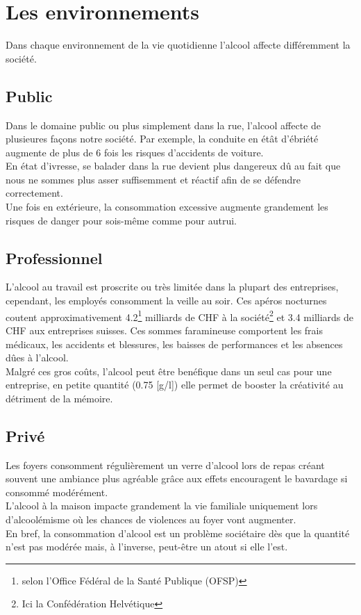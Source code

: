 \documentclass[a4paper, 12pt]{extarticle}
\begin{document}
  \section{Les environnements}
  Dans chaque environnement de la vie quotidienne l'alcool affecte différemment la société.
  \subsection{Public}
  Dans le domaine public ou plus simplement dans la rue, l'alcool affecte de plusieures façons notre société. Par exemple, la conduite en étât d'ébriété augmente de plus de 6 fois les risques d'accidents de voiture.\\
  En état d'ivresse, se balader dans la rue devient plus dangereux dû au fait que nous ne sommes plus asser suffisemment et réactif afin de se défendre correctement.\\
  Une fois en extérieure, la consommation excessive augmente grandement les risques de danger pour sois-même comme pour autrui.
  \subsection{Professionnel}
  L'alcool au travail est proscrite ou très limitée dans la plupart des entreprises, cependant, les employés consomment la veille au soir. Ces apéros nocturnes coutent approximativement 4.2\footnote{selon l'Office Fédéral de la Santé Publique (OFSP)} milliards de CHF à la société\footnote{Ici la Confédération Helvétique} et 3.4 milliards de CHF aux entreprises suisses. Ces sommes faramineuse comportent les frais médicaux, les accidents et blessures, les baisses de performances et les absences dûes à l'alcool.\\
  Malgré ces gros coûts, l'alcool peut être benéfique dans un seul cas pour une entreprise, en petite quantité (0.75 [g/l]) elle permet de booster la créativité au détriment de la mémoire.
  \subsection{Privé}
  Les foyers consomment régulièrement un verre d'alcool lors de repas créant  souvent une ambiance plus agréable grâce aux effets encouragent le bavardage si consommé modérément.\\
  L'alcool à la maison impacte grandement la vie familiale uniquement lors d'alcoolémisme où les chances de violences au foyer vont augmenter.\\
  En bref, la consommation d'alcool est un problème sociétaire dès que la quantité n'est pas modérée mais, à l'inverse, peut-être un atout si elle l'est. 
\end{document}
